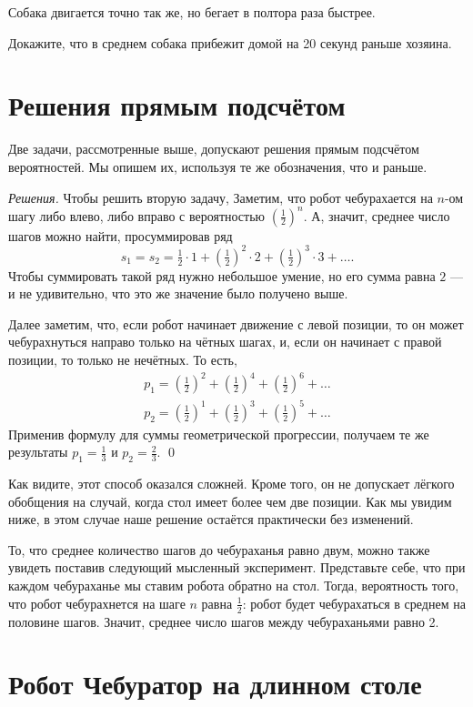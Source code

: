 \documentclass{article}
\begin{document}
Собака двигается точно так же, но бегает в полтора раза быстрее.

Докажите, что в среднем собака прибежит домой на 20 секунд раньше хозяина.

\section{Решения прямым подсчётом}

Две задачи, рассмотренные выше, допускают решения прямым подсчётом вероятностей. 
Мы опишем их, используя те же обозначения, что и раньше.

\medskip
\noindent\textit{Решения.}
Чтобы решить вторую задачу, 
Заметим, что робот чебурахается на $n$-ом шагу либо влево, либо вправо с вероятностью $(\tfrac12)^n$.
А, значит, среднее число шагов можно найти, просуммировав ряд
\[s_1=s_2=\tfrac12\cdot1+(\tfrac12)^2\cdot 2+(\tfrac12)^3\cdot 3+\dots.\]
Чтобы суммировать такой ряд нужно небольшое умение, 
но его сумма равна $2$ --- и не удивительно, что это же значение было получено выше.

Далее заметим, что, если робот начинает движение с левой позиции, 
то он может чебурахнуться направо только на чётных шагах, 
и, если он начинает с правой позиции, то только не нечётных.
То есть,
\begin{align*}
p_1=(\tfrac12)^2+(\tfrac12)^4+(\tfrac12)^6+\dots
\\
p_2=(\tfrac12)^1+(\tfrac12)^3+(\tfrac12)^5+\dots
\end{align*}
Применив формулу для суммы геометрической прогрессии, получаем те же результаты $p_1=\tfrac13$ и $p_2=\tfrac23$.
\qed
\medskip

Как видите, этот способ оказался сложней.
Кроме того, он не допускает лёгкого обобщения на случай, когда стол имеет более чем две позиции.
Как мы увидим ниже, в этом случае наше решение остаётся практически без изменений.

То, что среднее количество шагов до чебураханья
равно двум, можно также увидеть поставив следующий мысленный эксперимент.
Представьте себе, что при каждом чебураханье мы ставим робота обратно на стол.
Тогда, вероятность того, что робот чебурахнется на шаге $n$
равна $\tfrac12$: робот будет чебурахаться в среднем на половине шагов.
Значит, среднее число шагов между чебураханьями равно 2.


\section{Робот Чебуратор на длинном столе} 
\end{document}
